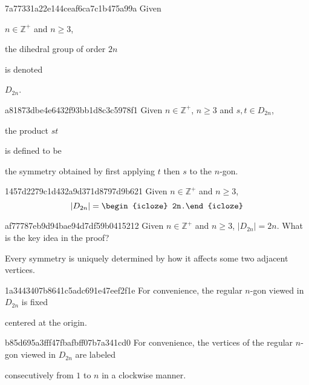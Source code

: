 \begin{note}{7a77331a22e144ceaf6ca7c1b475a99a}
    Given \begin{icloze}{3}\({ n \in \mathbb Z^{+} }\) and \({ n \geq 3 }\),\end{icloze}
    \begin{icloze}{1}the dihedral group of order \({ 2n }\)\end{icloze} is denoted \begin{icloze}{2}\({ D_{2n} }\).\end{icloze}
\end{note}

\begin{note}{a81873dbe4e6432f93bb1d8c3c5978f1}
   Given \({ n \in \mathbb Z^{+} }\), \({ n \geq 3 }\) and \({ s, t \in D_{2n} }\), \begin{icloze}{2}the product \({ st }\)\end{icloze} is defined to be \begin{icloze}{1}the symmetry obtained by first applying \({ t }\) then \({ s }\) to the \({ n }\)-gon.\end{icloze}
\end{note}

\begin{note}{1457d2279c1d432a9d371d8797d9b621}
   Given \({ n \in \mathbb Z^{+} }\) and \({ n \geq 3 }\),
   \[
       \lvert D_{2n} \rvert = \begin{icloze}{1}2n.\end{icloze}
   \]
\end{note}

\begin{note}{af77787eb9d94bae94d7df59b0415212}
   Given \({ n \in \mathbb Z^{+} }\) and \({ n \geq 3 }\), \({ \lvert D_{2n} \rvert = 2n. }\)
   What is the key idea in the proof?

   \begin{cloze}{1}
       Every symmetry is uniquely determined by how it affects some two adjacent vertices.
   \end{cloze}
\end{note}

\begin{note}{1a3443407b8641c5adc691e47eef2f1e}
    For convenience, the regular \({ n }\)-gon viewed in \({ D_{2n} }\) is fixed \begin{icloze}{1}centered at the origin.\end{icloze}
\end{note}

\begin{note}{b85d695a3fff47fbafbff07b7a341cd0}
    For convenience, the vertices of the regular \({ n }\)-gon viewed in \({ D_{2n} }\) are labeled \begin{icloze}{1}consecutively from \({ 1 }\) to \({ n }\) in a clockwise manner.\end{icloze}
\end{note}

